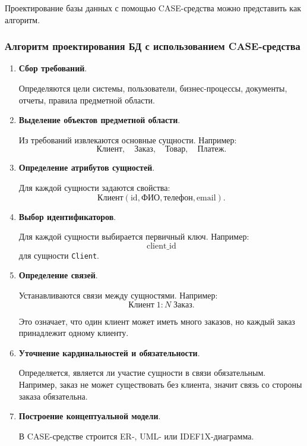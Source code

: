 \documentclass[12pt,a4paper]{article}
\theoremstyle{remark}
\begin{document}
Проектирование базы данных с помощью CASE-средства можно представить как алгоритм.

\subsubsection*{Алгоритм проектирования БД с использованием CASE-средства}

\begin{enumerate}
    \item \textbf{Сбор требований}.

    Определяются цели системы, пользователи, бизнес-процессы, документы, отчеты, правила предметной области.

    \item \textbf{Выделение объектов предметной области}.

    Из требований извлекаются основные сущности. Например:
    \[
        \text{Клиент}, \quad \text{Заказ}, \quad \text{Товар}, \quad \text{Платеж}.
    \]

    \item \textbf{Определение атрибутов сущностей}.

    Для каждой сущности задаются свойства:
    \[
        \text{Клиент}(\text{id}, \text{ФИО}, \text{телефон}, \text{email}).
    \]

    \item \textbf{Выбор идентификаторов}.

    Для каждой сущности выбирается первичный ключ. Например:
    \[
        \text{client\_id}
    \]
    для сущности \texttt{Client}.

    \item \textbf{Определение связей}.

    Устанавливаются связи между сущностями. Например:
    \[
        \text{Клиент} \; 1 : N \; \text{Заказ}.
    \]

    Это означает, что один клиент может иметь много заказов, но каждый заказ принадлежит одному клиенту.

    \item \textbf{Уточнение кардинальностей и обязательности}.

    Определяется, является ли участие сущности в связи обязательным. Например, заказ не может существовать без клиента, значит связь со стороны заказа обязательна.

    \item \textbf{Построение концептуальной модели}.

    В CASE-средстве строится ER-, UML- или IDEF1X-диаграмма.


\end{enumerate}
\end{document}
